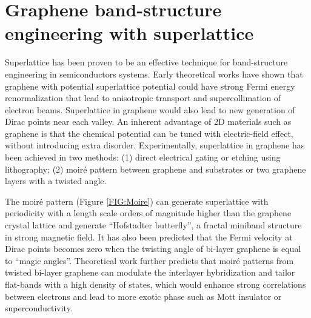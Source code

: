 \documentclass[pdflatex, sectionletters, 12pt]{pittetd}    %
\begin{document}
\section{Graphene band-structure engineering with superlattice}

Superlattice has been proven to be an effective technique for band-structure engineering in semiconductors systems\cite{tsu2010superlattice}. Early theoretical works have shown that graphene with potential superlattice potential could have strong Fermi energy renormalization that lead to anisotropic transport\cite{park2008anisotropic} and supercollimation of electron beams\cite{park2008electron}. Superlattice in graphene would also lead to new generation of Dirac points near each valley\cite{park2008new}. An inherent advantage of 2D materials such as graphene is that the chemical potential can be tuned with electric-field effect, without introducing extra disorder\cite{cao2018correlated}. Experimentally, superlattice in graphene has been achieved in two methods: (1) direct electrical gating or etching using lithography\cite{dubey2013tunable, forsythe2018band, jessen2019lithographic}; (2) moir{\'e} pattern between graphene and substrates\cite{dean2013hofstadter, hunt2013massive, ponomarenko2013cloing} or two graphene layers with a twisted angle\cite{cao2016superlattice, cao2018correlated, cao2018unconventional, chen2018gate, yankowitz2018dynamic}. 

The moir{\'e} pattern (Figure \ref{FIG:Moire}) can generate superlattice with periodicity with a length scale orders of magnitude higher than the graphene crystal lattice and generate ``Hofstadter butterfly'', a fractal miniband structure in strong magnetic field\cite{dean2013hofstadter, hunt2013massive, ponomarenko2013cloing}. It has also been predicted\cite{bistritzer2011moire} that the Fermi velocity at Dirac points becomes zero when the twisting angle of bi-layer graphene is equal to ``magic angles''. Theoretical work\cite{bistritzer2011moire, suarez2010flat, lopes2012continuum} further predicts that moir{\'e} patterns from twisted bi-layer graphene can modulate the interlayer hybridization and tailor flat-bands with a high density of states, which would enhance strong correlations between electrons and lead to more exotic phase such as Mott insulator\cite{cao2016superlattice, cao2018correlated, chen2018gate} or superconductivity\cite{cao2018unconventional}.
\end{document}
